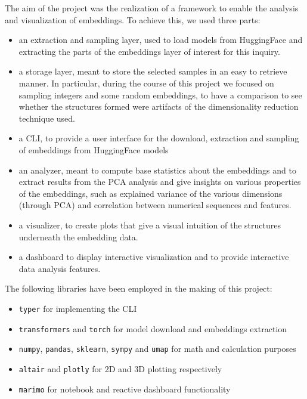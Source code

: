 \documentclass[
  a4paper, twoside, 10pt, titlepage]{book}
\providecommand{\tightlist}{%
  \setlength{\itemsep}{0pt}\setlength{\parskip}{0pt}}
\begin{document}
The aim of the project was the realization of a framework to enable the
analysis and visualization of embeddings. To achieve this, we used three
parts:

\begin{itemize}
\item
  an extraction and sampling layer, used to load models from HuggingFace
  and extracting the parts of the embeddings layer of interest for this
  inquiry.
\item
  a storage layer, meant to store the selected samples in an easy to
  retrieve manner. In particular, during the course of this project we
  focused on sampling integers and some random embeddings, to have a
  comparison to see whether the structures formed were artifacts of the
  dimensionality reduction technique used.
\item
  a CLI, to provide a user interface for the download, extraction and
  sampling of embeddings from HuggingFace models
\item
  an analyzer, meant to compute base statistics about the embeddings and
  to extract results from the PCA analysis and give insights on various
  properties of the embeddings, such as explained variance of the
  various dimensions (through PCA) and correlation between numerical
  sequences and features.
\item
  a visualizer, to create plots that give a visual intuition of the
  structures underneath the embedding data.
\item
  a dashboard to display interactive visualization and to provide
  interactive data analysis features.
\end{itemize}

The following libraries have been employed in the making of this
project:

\begin{itemize}
\tightlist
\item
  \texttt{typer} for implementing the CLI
\item
  \texttt{transformers} and \texttt{torch} for model download and
  embeddings extraction
\item
  \texttt{numpy}, \texttt{pandas}, \texttt{sklearn}, \texttt{sympy} and
  \texttt{umap} for math and calculation purposes
\item
  \texttt{altair} and \texttt{plotly} for 2D and 3D plotting
  respectively
\item
  \texttt{marimo} for notebook and reactive dashboard functionality
\end{itemize}
\end{document}
